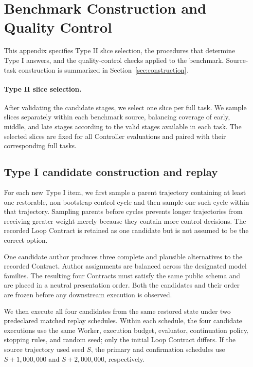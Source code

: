 \section{Benchmark Construction and Quality Control}
\label{app:construction}

This appendix specifies Type II slice selection, the procedures that determine Type I answers, and the quality-control checks applied to the benchmark. Source-task construction is summarized in Section~\ref{sec:construction}.

\paragraph{Type II slice selection.}
After validating the candidate stages, we select one slice per full task. We sample slices separately within each benchmark source, balancing coverage of early, middle, and late stages according to the valid stages available in each task. The selected slices are fixed for all Controller evaluations and paired with their corresponding full tasks.

\subsection{Type I candidate construction and replay}

For each new Type I item, we first sample a parent trajectory containing at least one restorable, non-bootstrap control cycle and then sample one such cycle within that trajectory. Sampling parents before cycles prevents longer trajectories from receiving greater weight merely because they contain more control decisions. The recorded Loop Contract is retained as one candidate but is not assumed to be the correct option.

One candidate author produces three complete and plausible alternatives to the recorded Contract. Author assignments are balanced across the designated model families. The resulting four Contracts must satisfy the same public schema and are placed in a neutral presentation order. Both the candidates and their order are frozen before any downstream execution is observed.

We then execute all four candidates from the same restored state under two predeclared matched replay schedules. Within each schedule, the four candidate executions use the same Worker, execution budget, evaluator, continuation policy, stopping rules, and random seed; only the initial Loop Contract differs. If the source trajectory used seed \(S\), the primary and confirmation schedules use \(S+1{,}000{,}000\) and \(S+2{,}000{,}000\), respectively.

